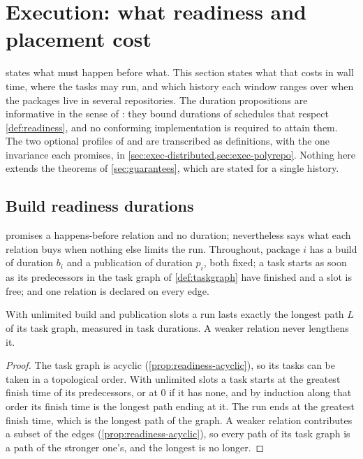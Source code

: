 \section{Execution: what readiness and placement cost}
\label{sec:execution}

 states what must happen before what. This section states
what that costs in wall time, where the tasks may run, and which history each
window ranges over when the packages live in several repositories. The duration
propositions are informative in the sense of : they bound
durations of schedules that respect \cref{def:readiness}, and no conforming
implementation is required to attain them. The two optional profiles of
 and  are transcribed as definitions, with the one invariance
each promises, in \cref{sec:exec-distributed,sec:exec-polyrepo}. Nothing here
extends the theorems of \cref{sec:guarantees}, which are stated for a single
history.

\subsection{Build readiness durations}
\label{sec:exec-durations}

 promises a happens-before relation and no duration; 
nevertheless says what each relation buys when nothing else limits the run.
Throughout, package $i$ has a build of duration $b_i$ and a publication of
duration $p_i$, both fixed; a task starts as soon as its predecessors in the
task graph of \cref{def:taskgraph} have finished and a slot is free; and one
relation is declared on every edge.

\begin{proposition}
\label{prop:exec-longest}
With unlimited build and publication slots a run lasts exactly the longest
path $L$ of its task graph, measured in task durations. A weaker relation
never lengthens it.
\end{proposition}

\begin{proof}
The task graph is acyclic (\cref{prop:readiness-acyclic}), so its tasks can be
taken in a topological order. With unlimited slots a task starts at the
greatest finish time of its predecessors, or at $0$ if it has none, and by
induction along that order its finish time is the longest path ending at it.
The run ends at the greatest finish time, which is the longest path of the
graph. A weaker relation contributes a subset of the edges
(\cref{prop:readiness-acyclic}), so every path of its task graph is a path of
the stronger one's, and the longest is no longer.
\end{proof}

